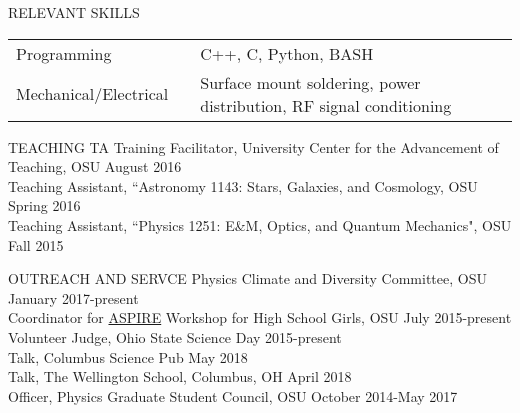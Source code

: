 \documentclass{resume} %
\begin{document}
\begin{rSection}{RELEVANT SKILLS}
\begin{tabular}{@{}l l l@{}}
 Programming & & C++, C, Python, BASH  \\ 
 Mechanical/Electrical & & Surface mount soldering, power distribution, RF signal conditioning  \\  
\end{tabular}
\end{rSection}

\begin{rSection}{TEACHING}
TA Training Facilitator, University Center for the Advancement of Teaching, OSU \hfill {August 2016}\\
Teaching Assistant, ``Astronomy 1143: Stars, Galaxies, and Cosmology, OSU \hfill {Spring 2016}\\
Teaching Assistant, ``Physics 1251: E\&M, Optics, and Quantum Mechanics", OSU \hfill {Fall 2015}\\
\end{rSection}
\vspace{-0.35cm}

\begin{rSection}{OUTREACH AND SERVCE}
Physics Climate and Diversity Committee, OSU \hfill January 2017-present\\
Coordinator for \href{u.osu.edu/aspire}{ASPIRE} Workshop for High School Girls, OSU \hfill July 2015-present\\
Volunteer Judge, Ohio State Science Day \hfill 2015-present\\
Talk, Columbus Science Pub \hfill  May 2018\\
Talk, The Wellington School, Columbus, OH \hfill April 2018\\
Officer, Physics Graduate Student Council, OSU \hfill October 2014-May 2017 \\
\end{rSection}
\vspace{-0.30cm}
\end{document}
